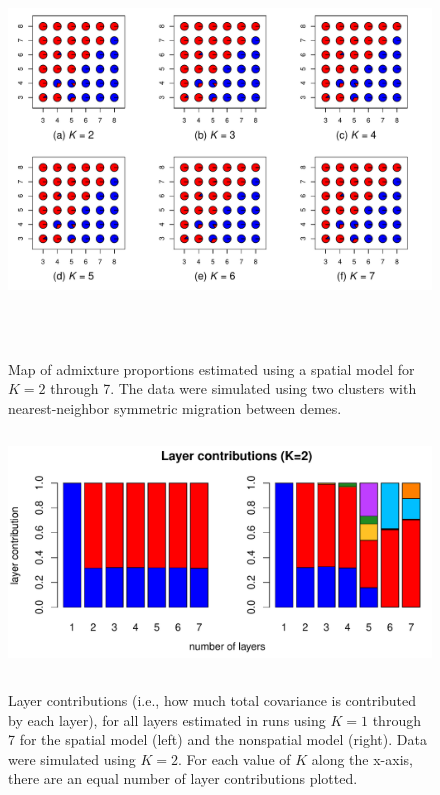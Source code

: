 \documentclass[12pt]{article}
\begin{document}
\begin{figure}
	\centering
		{\includegraphics[width=6in,height=4in]{figs/sims/simK2_sp_pies.pdf}}
	\caption{
	Map of admixture proportions estimated using a spatial model for $K=2$ through 7.
	The data were simulated using two clusters with nearest-neighbor symmetric migration between demes.
    }\label{simK2_sp_pies}
\end{figure}

\begin{figure}
	\centering
		{\includegraphics[width=5in,height=2.5in]{figs/sims/simK2_laycon_barplots.pdf}}
		\caption{
			Layer contributions (i.e., how much total covariance is contributed by each layer), 
			for all layers estimated in runs using $K = 1$ through 7 
			for the spatial model (left) and the nonspatial model (right).
			Data were simulated using $K=2$.
			For each value of $K$ along the x-axis, there are an equal number of layer contributions plotted.
		}\label{simK2_laycon}
\end{figure}
\end{document}
